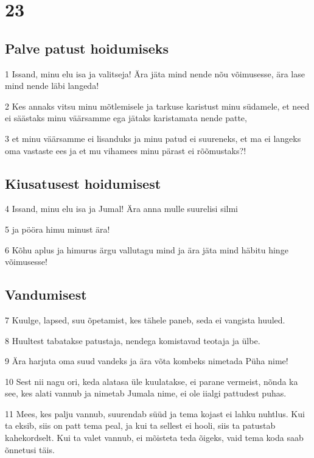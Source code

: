 \chapter{23}

\section*{Palve patust hoidumiseks}

\par 1 Issand, minu elu isa ja valitseja! Ära jäta mind nende nõu võimusesse, ära lase mind nende läbi langeda!
\par 2 Kes annaks vitsu minu mõtlemisele ja tarkuse karistust minu südamele, et need ei säästaks minu väärsamme ega jätaks karistamata nende patte,
\par 3 et minu väärsamme ei lisanduks ja minu patud ei suureneks, et ma ei langeks oma vastaste ees ja et mu vihamees minu pärast ei rõõmustaks?!

\section*{Kiusatusest hoidumisest}

\par 4 Issand, minu elu isa ja Jumal! Ära anna mulle suurelisi silmi
\par 5 ja pööra himu minust ära!
\par 6 Kõhu aplus ja himurus ärgu vallutagu mind ja ära jäta mind häbitu hinge võimusesse!

\section*{Vandumisest}

\par 7 Kuulge, lapsed, suu õpetamist, kes tähele paneb, seda ei vangista huuled.
\par 8 Huultest tabatakse patustaja, nendega komistavad teotaja ja ülbe.
\par 9 Ära harjuta oma suud vandeks ja ära võta kombeks nimetada Püha nime!
\par 10 Sest nii nagu ori, keda alatasa üle kuulatakse, ei parane vermeist, nõnda ka see, kes alati vannub ja nimetab Jumala nime, ei ole iialgi pattudest puhas.
\par 11 Mees, kes palju vannub, suurendab süüd ja tema kojast ei lahku nuhtlus. Kui ta eksib, siis on patt tema peal, ja kui ta sellest ei hooli, siis ta patustab kahekordselt. Kui ta valet vannub, ei mõisteta teda õigeks, vaid tema koda saab õnnetusi täis.

